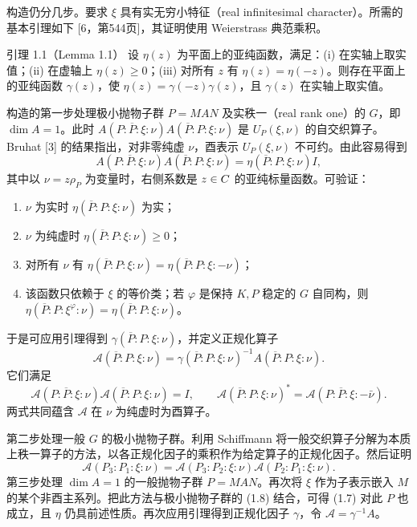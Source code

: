 构造仍分几步。要求 $\xi$ 具有实无穷小特征（real infinitesimal character）。所需的基本引理如下 [6，第544页]，其证明使用 Weierstrass 典范乘积。
\begin{originaltheorem}{引理 1.1（Lemma 1.1）}
设 $\eta(z)$ 为平面上的亚纯函数，满足：(i) 在实轴上取实值；(ii) 在虚轴上 $\eta(z)\ge0$；(iii) 对所有 $z$ 有 $\eta(z)=\eta(-z)$。则存在平面上的亚纯函数 $\gamma(z)$，使 $\eta(z)=\gamma(-z)\gamma(z)$，且 $\gamma(z)$ 在实轴上取实值。
\end{originaltheorem}
构造的第一步处理极小抛物子群 $P=MAN$ 及实秩一（real rank one）的 $G$，即 $\dim A=1$。此时 $A(P:\overline P:\xi:\nu)A(\overline P:P:\xi:\nu)$ 是 $U_P(\xi,\nu)$ 的自交织算子。Bruhat [3] 的结果指出，对非零纯虚 $\nu$，酉表示 $U_P(\xi,\nu)$ 不可约。由此容易得到
\begin{equation}
 A(P:\overline P:\xi:\nu)A(\overline P:P:\xi:\nu)
 =\eta(\overline P:P:\xi:\nu)I,
 \tag{1.7}
\end{equation}
其中以 $\nu=z\rho_P$ 为变量时，右侧系数是 $z\in C$ 的亚纯标量函数。可验证：
\begin{enumerate}
\item[(i)] $\nu$ 为实时 $\eta(\overline P:P:\xi:\nu)$ 为实；
\item[(ii)] $\nu$ 为纯虚时 $\eta(\overline P:P:\xi:\nu)\ge0$；
\item[(iii)] 对所有 $\nu$ 有 $\eta(\overline P:P:\xi:\nu)=\eta(\overline P:P:\xi:-\nu)$；
\item[(iv)] 该函数只依赖于 $\xi$ 的等价类；若 $\varphi$ 是保持 $K,P$ 稳定的 $G$ 自同构，则 $\eta(\overline P:P:\xi^\varphi:\nu)=\eta(\overline P:P:\xi:\nu)$。
\end{enumerate}
于是可应用引理得到 $\gamma(\overline P:P:\xi:\nu)$，并定义正规化算子
\[
 \mathcal A(\overline P:P:\xi:\nu)=\gamma(\overline P:P:\xi:\nu)^{-1}A(\overline P:P:\xi:\nu).
\]
它们满足
\[
 \mathcal A(P:\overline P:\xi:\nu)\mathcal A(\overline P:P:\xi:\nu)=I,
 \qquad
 \mathcal A(\overline P:P:\xi:\nu)^*=\mathcal A(P:\overline P:\xi:-\bar\nu).
\]
两式共同蕴含 $\mathcal A$ 在 $\nu$ 为纯虚时为酉算子。

第二步处理一般 $G$ 的极小抛物子群。利用 Schiffmann 将一般交织算子分解为本质上秩一算子的方法，以各正规化因子的乘积作为给定算子的正规化因子。然后证明
\begin{equation}
 \mathcal A(P_3:P_1:\xi:\nu)
 =\mathcal A(P_3:P_2:\xi:\nu)\mathcal A(P_2:P_1:\xi:\nu).
 \tag{1.8}
\end{equation}
第三步处理 $\dim A=1$ 的一般抛物子群 $P=MAN$。再次将 $\xi$ 作为子表示嵌入 $M$ 的某个非酉主系列。把此方法与极小抛物子群的 (1.8) 结合，可得 (1.7) 对此 $P$ 也成立，且 $\eta$ 仍具前述性质。再次应用引理得到正规化因子 $\gamma$，令 $\mathcal A=\gamma^{-1}A$。

